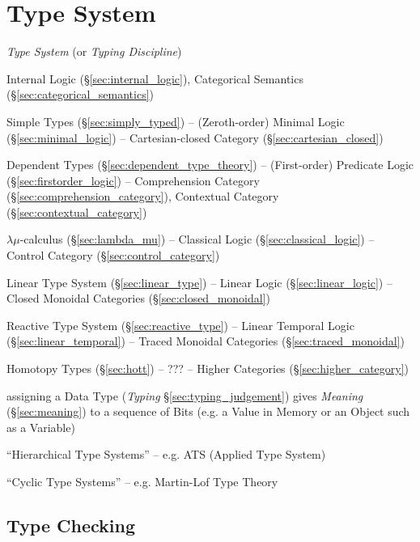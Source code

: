 \section{Type System}\label{sec:type_system}

\emph{Type System} (or \emph{Typing Discipline})

Internal Logic (\S\ref{sec:internal_logic}), Categorical Semantics
(\S\ref{sec:categorical_semantics})

Simple Types (\S\ref{sec:simply_typed}) -- (Zeroth-order) Minimal
Logic (\S\ref{sec:minimal_logic}) -- Cartesian-closed Category
(\S\ref{sec:cartesian_closed})

Dependent Types (\S\ref{sec:dependent_type_theory}) -- (First-order)
Predicate Logic (\S\ref{sec:firstorder_logic}) -- Comprehension
Category (\S\ref{sec:comprehension_category}), Contextual Category
(\S\ref{sec:contextual_category})

$\lambda\mu$-calculus (\S\ref{sec:lambda_mu}) -- Classical Logic
(\S\ref{sec:classical_logic}) -- Control Category
(\S\ref{sec:control_category})

Linear Type System (\S\ref{sec:linear_type}) -- Linear Logic
(\S\ref{sec:linear_logic}) -- Closed Monoidal Categories
(\S\ref{sec:closed_monoidal})

Reactive Type System (\S\ref{sec:reactive_type}) -- Linear Temporal
Logic (\S\ref{sec:linear_temporal}) -- Traced Monoidal Categories
(\S\ref{sec:traced_monoidal})

Homotopy Types (\S\ref{sec:hott}) -- ??? -- Higher Categories
(\S\ref{sec:higher_category})

assigning a Data Type (\emph{Typing} \S\ref{sec:typing_judgement})
gives \emph{Meaning} (\S\ref{sec:meaning}) to a sequence of Bits (e.g.
a Value in Memory or an Object such as a Variable)

``Hierarchical Type Systems'' -- e.g. ATS (Applied Type System)

``Cyclic Type Systems'' -- e.g. Martin-Lof Type Theory



\subsection{Type Checking}\label{sec:type_checking}

